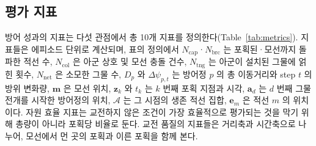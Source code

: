 \subsection{평가 지표}
\label{sec:metrics}

방어 성과의 지표는 다섯 관점에서 총 10개 지표를 정의한다(Table~\ref{tab:metrics}). 지표들은 에피소드
단위로 계산되며, 표의 정의에서 $N_\mathrm{cap}$·$N_\mathrm{brc}$ 는 포획된·모선까지 돌파한 적선
수, $N_\mathrm{col}$ 은 아군 상호 및 모선 충돌 건수, $N_\mathrm{tng}$ 는 아군이 설치된
그물에 얽힌 횟수, $N_\mathrm{net}$ 은 소모한 그물 수, $D_p$ 와 $\Delta\psi_{p,t}$ 는
방어정 $p$ 의 총 이동거리와 step $t$ 의 방위 변화량, $\mathbf{m}$ 은 모선 위치,
$\mathbf{z}_k$ 와 $t_k$ 는 $k$ 번째 포획 지점과 시각, $\mathbf{a}_d$ 는 $d$ 번째 그물
전개를 시작한 방어정의 위치, $\mathcal{A}$ 는 그 시점의 생존 적선 집합, $\mathbf{e}_m$ 은 적선 $m$ 의 위치이다.
자원 효율 지표는 교전하지 않은 조건이 가장 효율적으로 평가되는 것을 막기 위해 총량이
아니라 포획당 비율로 둔다. 교전 품질의 지표들은 거리축과 시간축으로 나누어, 모선에서 먼 곳의
포획과 이른 포획을 함께 본다.
